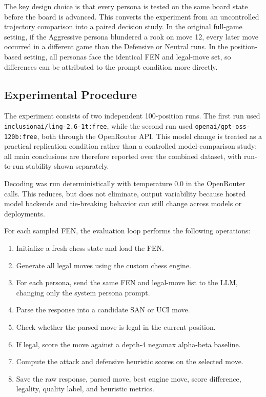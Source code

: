 \documentclass[10pt]{article}
\begin{document}
The key design choice is that every persona is tested on the same board state before the board is advanced. This converts the experiment from an uncontrolled trajectory comparison into a paired decision study. In the original full-game setting, if the Aggressive persona blundered a rook on move 12, every later move occurred in a different game than the Defensive or Neutral runs. In the position-based setting, all personas face the identical FEN and legal-move set, so differences can be attributed to the prompt condition more directly.

\subsection{Experimental Procedure}

The experiment consists of two independent 100-position runs. The first run used \texttt{inclusionai/ling-2.6-1t:free}, while the second run used \texttt{openai/gpt-oss-120b:free}, both through the OpenRouter API. This model change is treated as a practical replication condition rather than a controlled model-comparison study; all main conclusions are therefore reported over the combined dataset, with run-to-run stability shown separately.

Decoding was run deterministically with temperature 0.0 in the OpenRouter calls. This reduces, but does not eliminate, output variability because hosted model backends and tie-breaking behavior can still change across models or deployments.

For each sampled FEN, the evaluation loop performs the following operations:

\begin{enumerate}
    \item Initialize a fresh chess state and load the FEN.
    \item Generate all legal moves using the custom chess engine.
    \item For each persona, send the same FEN and legal-move list to the LLM, changing only the system persona prompt.
    \item Parse the response into a candidate SAN or UCI move.
    \item Check whether the parsed move is legal in the current position.
    \item If legal, score the move against a depth-4 negamax alpha-beta baseline.
    \item Compute the attack and defensive heuristic scores on the selected move.
    \item Save the raw response, parsed move, best engine move, score difference, legality, quality label, and heuristic metrics.
\end{enumerate}
\end{document}
